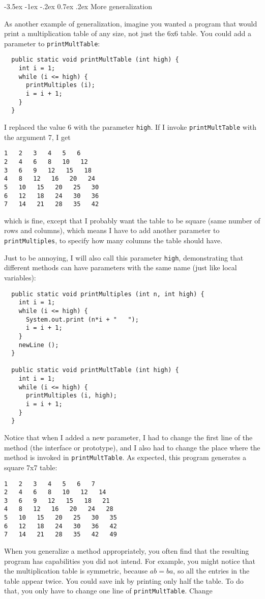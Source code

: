 \documentclass{book}
\makeatletter
\renewcommand{\section}{\@startsection 
    {section} {1} {0mm}%
    {-3.5ex \@plus -1ex \@minus -.2ex}%
    {0.7ex \@plus.2ex}%
    {\normalfont\Large\bfseries}}
\makeatother
\begin{document}

\section{More generalization}

As another example of generalization, imagine you wanted
a program that would print a multiplication table of any
size, not just the 6x6 table.  You could add a parameter to
{\tt printMultTable}:

\begin{verbatim}
  public static void printMultTable (int high) {
    int i = 1;
    while (i <= high) {
      printMultiples (i);
      i = i + 1;
    }
  }
\end{verbatim}
%
I replaced the value 6 with the parameter {\tt high}.  If I
invoke {\tt printMultTable} with the argument 7, I get

\begin{verbatim}
1   2   3   4   5   6   
2   4   6   8   10   12   
3   6   9   12   15   18   
4   8   12   16   20   24   
5   10   15   20   25   30   
6   12   18   24   30   36   
7   14   21   28   35   42   
\end{verbatim}
%
which is fine, except that I probably want the table to
be square (same number of rows and columns), which means
I have to add another parameter to {\tt printMultiples},
to specify how many columns the table should have.

Just to be annoying, I will also call this parameter {\tt high},
demonstrating that different methods can have parameters
with the same name (just like local variables):

\begin{verbatim}
  public static void printMultiples (int n, int high) {
    int i = 1;
    while (i <= high) {
      System.out.print (n*i + "   ");
      i = i + 1;
    }    
    newLine ();
  }

  public static void printMultTable (int high) {
    int i = 1;
    while (i <= high) {
      printMultiples (i, high);
      i = i + 1;
    }
  }
\end{verbatim}
%
Notice that when I added a new parameter, I had to change the first
line of the method (the interface or prototype), and I also had to
change the place where the method is invoked in {\tt printMultTable}.
As expected, this program generates a square 7x7 table:

\begin{verbatim}
1   2   3   4   5   6   7   
2   4   6   8   10   12   14   
3   6   9   12   15   18   21   
4   8   12   16   20   24   28   
5   10   15   20   25   30   35   
6   12   18   24   30   36   42   
7   14   21   28   35   42   49
\end{verbatim}
%
When you generalize a method appropriately, you often find
that the resulting program has capabilities you did not intend.
For example, you might notice that the multiplication table
is symmetric, because $ab = ba$, so all the entries in the
table appear twice.  You could save ink by printing only
half the table.  To do that, you only have to change one
line of {\tt printMultTable}.  Change
\end{document}
